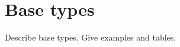 \chapter{Base types}
\label{chap:base-types}
Describe \pads{} base types.  Give examples and tables. 